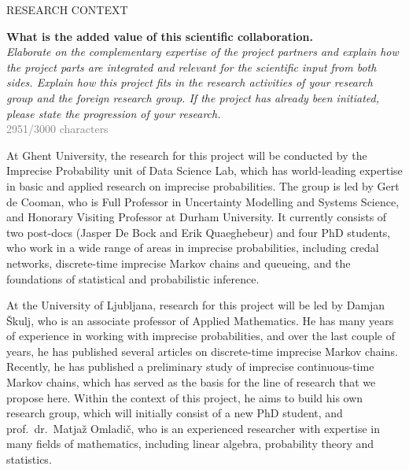 \documentclass[11pt,dvipsnames,usenames,a4paper]{article}
\begin{document}


\vspace{7pt}




\vspace{5mm}

\begin{shaded}\centering RESEARCH CONTEXT \end{shaded}
\textbf{What is the added value of this scientific collaboration.}\\
\textit{Elaborate on the complementary expertise of the project partners and explain how the project parts are integrated and relevant for the scientific input from both sides. Explain how this project fits in the research activities of your research group and the foreign research group. If the project has already been initiated, please state the progression of your research.}\\
\textcolor{Gray}{2951/3000 characters}

At Ghent University, the research for this project will be conducted by the Imprecise Probability unit of Data Science Lab, which has world-leading expertise in basic and applied research on imprecise probabilities.
The group is led by Gert de Cooman, who is Full Professor in Uncertainty Modelling and Systems Science, and Honorary Visiting Professor at Durham University.
It currently consists of two post-docs (Jasper De Bock and Erik Quaeghebeur) and four PhD students, who work in a wide range of areas in imprecise probabilities, including credal networks, discrete-time imprecise Markov chains and queueing, and the foundations of statistical and probabilistic inference.

At the University of Ljubljana, research for this project will be led by Damjan \v{S}kulj, who is an associate professor of Applied Mathematics. 
He has many years of experience in working with imprecise probabilities, and over the last couple of years, he has published several articles on discrete-time imprecise Markov chains. 
Recently, he has published a preliminary study of imprecise continuous-time Markov chains, which has served as the basis for the line of research that we propose here.
Within the context of this project, he aims to build his own research group, which will initially consist of a new PhD student, and prof.~dr.~Matja\v{z} Omladi\v{c}, who is an experienced researcher with expertise in many fields of mathematics, including linear algebra, probability theory and statistics.
\end{document}
